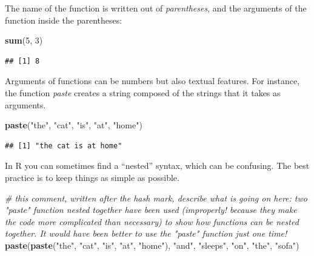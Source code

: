 \documentclass[
]{article}
\newenvironment{Shaded}{\begin{snugshade}}{\end{snugshade}}
\newcommand{\CommentTok}[1]{\textcolor[rgb]{0.56,0.35,0.01}{\textit{#1}}}
\newcommand{\DecValTok}[1]{\textcolor[rgb]{0.00,0.00,0.81}{#1}}
\newcommand{\KeywordTok}[1]{\textcolor[rgb]{0.13,0.29,0.53}{\textbf{#1}}}
\newcommand{\NormalTok}[1]{#1}
\newcommand{\StringTok}[1]{\textcolor[rgb]{0.31,0.60,0.02}{#1}}
\begin{document}
The name of the function is written out of \emph{parentheses}, and the arguments of the function inside the parentheses:

\begin{Shaded}
\begin{Highlighting}[]
\KeywordTok{sum}\NormalTok{(}\DecValTok{5}\NormalTok{, }\DecValTok{3}\NormalTok{)}
\end{Highlighting}
\end{Shaded}

\begin{verbatim}
## [1] 8
\end{verbatim}

Arguments of functions can be numbers but also textual features. For instance, the function \emph{paste} creates a string composed of the strings that it takes as arguments.

\begin{Shaded}
\begin{Highlighting}[]
\KeywordTok{paste}\NormalTok{(}\StringTok{"the"}\NormalTok{, }\StringTok{"cat"}\NormalTok{, }\StringTok{"is"}\NormalTok{, }\StringTok{"at"}\NormalTok{, }\StringTok{"home"}\NormalTok{)}
\end{Highlighting}
\end{Shaded}

\begin{verbatim}
## [1] "the cat is at home"
\end{verbatim}

In R you can sometimes find a ``nested'' syntax, which can be confusing. The best practice is to keep things as simple as possible.

\begin{Shaded}
\begin{Highlighting}[]
\CommentTok{# this comment, written after the hash mark, describe what is going on here: two "paste" function nested together have been used (improperly! because they make the code more complicated than necessary) to show how functions can be nested together. It would have been better to use the "paste" function just one time!}
\KeywordTok{paste}\NormalTok{(}\KeywordTok{paste}\NormalTok{(}\StringTok{"the"}\NormalTok{, }\StringTok{"cat"}\NormalTok{, }\StringTok{"is"}\NormalTok{, }\StringTok{"at"}\NormalTok{, }\StringTok{"home"}\NormalTok{), }\StringTok{"and"}\NormalTok{, }\StringTok{"sleeps"}\NormalTok{, }\StringTok{"on"}\NormalTok{, }\StringTok{"the"}\NormalTok{, }\StringTok{"sofa"}\NormalTok{)}
\end{Highlighting}
\end{Shaded}
\end{document}
